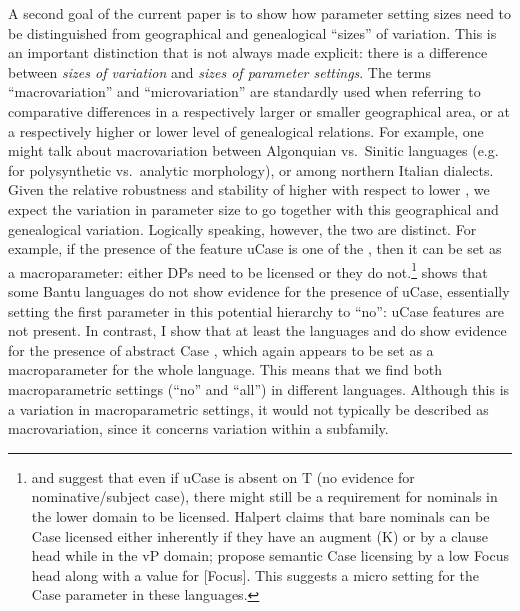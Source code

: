 \documentclass[output=paper]{langsci/langscibook}
\begin{document}
\largerpage
A second goal of the current paper is to show how parameter setting sizes need
to be distinguished from geographical and genealogical \enquote{sizes} of variation.
This is an important distinction that is not always made explicit: there is a
difference between \emph{sizes of variation} and \emph{sizes of parameter
settings}. The terms \enquote{macrovariation} and
\enquote{microvariation} are standardly used
when referring to comparative differences in a respectively larger or smaller
geographical area, or at a respectively higher or lower level of genealogical
relations. For example, one might talk about macrovariation between Algonquian
vs.\ Sinitic languages (e.g. for polysynthetic vs.\ analytic morphology), or
 among northern Italian dialects. Given the relative robustness
and stability of higher  with respect to lower , we expect
the variation in parameter size to go together with this geographical and
genealogical variation. Logically speaking, however, the two are distinct. For
example, if the presence of the feature uCase is one of the , then it
can be set as a macroparameter: either DPs need to be licensed or they do
not.\footnote{\textcite{Halpert2012,Halpert2016} and
    \citet{CarstensMletshe2015} suggest that even if uCase is absent on T (no
    evidence for nominative/subject case), there might still be a requirement
    for nominals in the lower domain to be licensed. Halpert claims that bare
    nominals can be Case licensed either inherently if they have an augment (K)
    or by a clause head while in the vP domain;
    \citeauthor{CarstensMletshe2015} propose semantic Case
    licensing by a low
Focus head along with a value for [Focus].  This suggests a micro setting for
the Case parameter in these languages.} \citet{Diercks2012} shows that some
Bantu languages do not show evidence for the presence of
uCase, essentially
setting the first parameter in this potential hierarchy to \enquote{no}: uCase features
are not present. In contrast, I show that at least the  languages 
and  do show evidence for the presence of abstract Case
\parencite{vanderWal2015}, which again appears to be set as a macroparameter
for the whole language. This means that we find both macroparametric settings
(\enquote{no} and \enquote{all}) in different  languages.  Although this is a variation in
macroparametric settings, it would not typically be described as
macrovariation, since it concerns variation within a subfamily.
\end{document}
